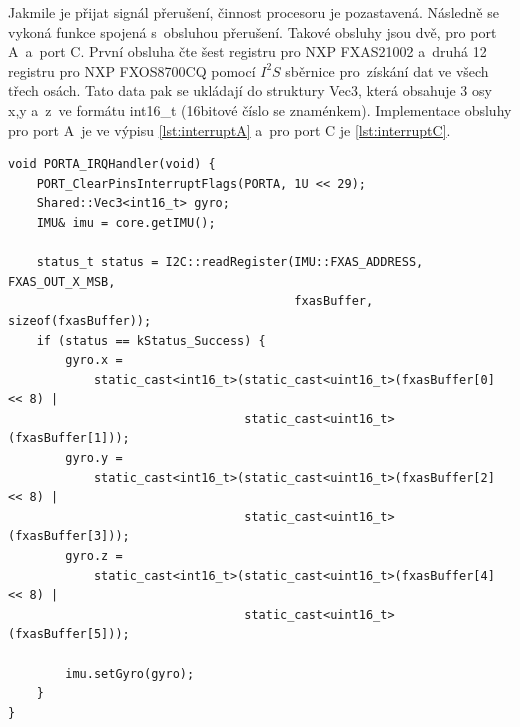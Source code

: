 Jakmile je přijat signál přerušení, činnost procesoru je pozastavená. Následně se vykoná funkce spojená s~obsluhou přerušení. Takové obsluhy jsou dvě, pro port A~a~port C. 
První obsluha čte šest registru pro NXP FXAS21002 a~druhá 12 registru pro NXP 
FXOS8700CQ pomocí $I^2S$ sběrnice pro~získání dat ve všech třech osách. Tato data 
pak se ukládají do struktury Vec3, která obsahuje 3 osy x,y a~z~ve formátu 
int16\_t (16bitové číslo se znaménkem). Implementace obsluhy pro port A~je ve výpisu 
\ref{lst:interruptA} a~pro port C je \ref{lst:interruptC}.

\begin{lstlisting}[caption = Funkce obsluhy přerušení na portu A., label = lst:interruptA]
void PORTA_IRQHandler(void) {
    PORT_ClearPinsInterruptFlags(PORTA, 1U << 29);
    Shared::Vec3<int16_t> gyro;
    IMU& imu = core.getIMU();

    status_t status = I2C::readRegister(IMU::FXAS_ADDRESS, FXAS_OUT_X_MSB,
                                        fxasBuffer, sizeof(fxasBuffer));
    if (status == kStatus_Success) {
        gyro.x =
            static_cast<int16_t>(static_cast<uint16_t>(fxasBuffer[0] << 8) |
                                 static_cast<uint16_t>(fxasBuffer[1]));
        gyro.y =
            static_cast<int16_t>(static_cast<uint16_t>(fxasBuffer[2] << 8) |
                                 static_cast<uint16_t>(fxasBuffer[3]));
        gyro.z =
            static_cast<int16_t>(static_cast<uint16_t>(fxasBuffer[4] << 8) |
                                 static_cast<uint16_t>(fxasBuffer[5]));

        imu.setGyro(gyro);
    }
}
\end{lstlisting}

